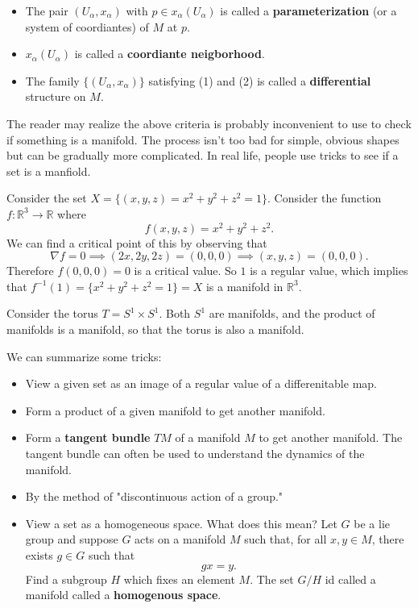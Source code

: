 \documentclass[12pt,letterpaper,boxed]{maths_v5}
\newcommand{\rr}{\mathbb{R}}
\theoremstyle{definition}
\begin{document}
    \begin{itemize}
        \item The pair $(U_\alpha, x_\alpha)$ with $p \in x_\alpha(U_\alpha)$ 
        is called a \textbf{parameterization} (or a system of coordiantes) of $M$ at $p$. 

        \item $x_\alpha(U_\alpha)$ is called a \textbf{coordiante neigborhood}. 
        \item The family $\{(U_\alpha, x_\alpha)\}$ satisfying (1) and (2) is called 
        a \textbf{differential} structure on $M$. 
    \end{itemize}
    The reader may realize the above criteria is probably inconvenient to use to 
    check if something is a manifold. The process isn't too bad for simple, obvious shapes 
    but can be gradually more complicated. In real life, people use tricks to see if a
    set is a manfiold. 

    \begin{example}
        Consider the set $X = \{(x,y,z) = x^2 + y^2 + z^2 = 1\}$. 
        Consider the function $f: \rr^3 \to \rr$ where 
        \[
            f(x, y, z) = x^2 + y^2  + z^2.
        \]
        We can find a critical point of this by observing that 
        \[
            \nabla f =  0 \implies (2x, 2y, 2z) = (0,0,0) \implies (x,y,z) = (0,0,0).
        \]
        Therefore $f(0,0,0) = 0$ is a critical value. So $1$ is a regular value, 
        which implies that 
        $f^{-1}(1) = \{x^2 + y^2 + z^2 = 1\} = X$ is a manifold in $\rr^3$.
    \end{example}

    \begin{example}
        Consider the torus $T = S^1 \times  S^1$. Both $S^1$ are manifolds, and 
        the product of manifolds is a manifold, so that the torus is also a manifold. 
    \end{example}

    We can summarize some tricks: 
    \begin{itemize}
        \item View a given set as an image of a regular value of a differenitable map. 
        \item Form a product of a given manifold to get another manifold. 
        \item Form a \textbf{tangent bundle} $TM$ of a manifold $M$ to get another 
        manifold. The tangent bundle can often be used to understand the dynamics of the manifold.  
        \item By the method of "discontinuous action of a group."
        \item View a set as a homogeneous space. What does this mean? Let $G$  
        be a lie group
        and suppose $G$ acts on a manifold $M$ such that, for all $x, y \in M$, 
        there exists $g \in  G$ such that 
        \[
            gx = y.
        \]
        Find a subgroup 
        $H$ which fixes an element $M$. The set $G/H$ id called a 
        manifold called a \textbf{homogenous space}. 
    \end{itemize}
\end{document}
